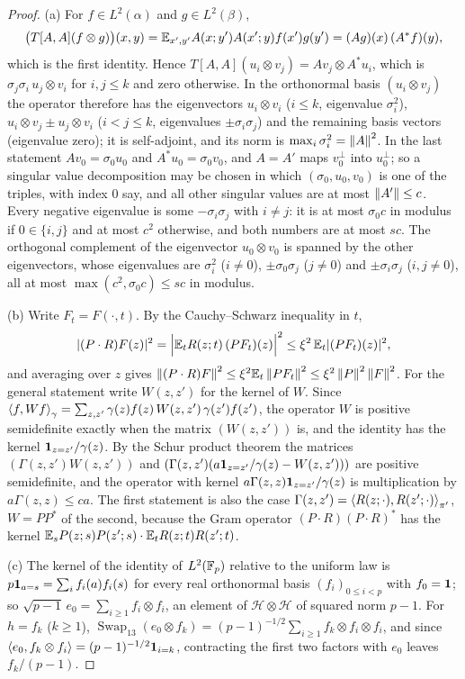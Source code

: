 \begin{proof}
(a) For $f\in L^2(\alpha)$ and $g\in L^2(\beta)$,
\[
  \big(T[A,A](f\otimes g)\big)(x,y)=\mathbb E_{x',y'}A(x;y')A(x';y)f(x')g(y')
  =(Ag)(x)\,(A^*f)(y),
\]
which is the first identity. Hence $T[A,A](u_i\otimes v_j)=Av_j\otimes A^*u_i$,
which is $\sigma_j\sigma_i\,u_j\otimes v_i$ for $i,j\le k$ and zero otherwise.
In the orthonormal basis $(u_i\otimes v_j)$ the operator therefore has the
eigenvectors $u_i\otimes v_i$ ($i\le k$, eigenvalue $\sigma_i^2$),
$u_i\otimes v_j\pm u_j\otimes v_i$ ($i<j\le k$, eigenvalues $\pm\sigma_i\sigma_j$)
and the remaining basis vectors (eigenvalue zero); it is self-adjoint, and its
norm is $\max_i\sigma_i^2=\left\|A\right\|^2$. In the last statement $Av_0=\sigma_0u_0$
and $A^*u_0=\sigma_0v_0$, and $A=A'$ maps $v_0^\perp$ into $u_0^\perp$; so a
singular value decomposition may be chosen in which $(\sigma_0,u_0,v_0)$ is one
of the triples, with index $0$ say, and all other singular values are at most
$\left\|A'\right\|\le c$. Every negative eigenvalue is some $-\sigma_i\sigma_j$ with
$i\ne j$: it is at most $\sigma_0c$ in modulus if $0\in\{i,j\}$ and at most $c^2$
otherwise, and both numbers are at most $sc$. The orthogonal complement of the
eigenvector $u_0\otimes v_0$ is spanned by the other eigenvectors, whose
eigenvalues are $\sigma_i^2$ ($i\ne0$), $\pm\sigma_0\sigma_j$ ($j\ne0$) and
$\pm\sigma_i\sigma_j$ ($i,j\ne0$), all at most $\max(c^2,\sigma_0c)\le sc$ in
modulus.

(b) Write $F_t=F(\cdot,t)$. By the Cauchy--Schwarz inequality in $t$,
\[
  |(P\cdot R)F(z)|^2=\Big|\mathbb E_tR(z;t)\,(PF_t)(z)\Big|^2\le\xi^2\,\mathbb E_t|(PF_t)(z)|^2,
\]
and averaging over $z$ gives
$\left\|(P\cdot R)F\right\|^2\le\xi^2\mathbb E_t\left\|PF_t\right\|^2\le\xi^2\left\|P\right\|^2\left\|F\right\|^2$. For
the general statement write $W(z,z')$ for the kernel of $W$. Since
$\left\langle f,Wf\right\rangle_\gamma=\sum_{z,z'}\gamma(z)f(z)\,W(z,z')\,\gamma(z')f(z')$, the
operator $W$ is positive semidefinite exactly when the matrix $(W(z,z'))$ is,
and the identity has the kernel $\mathbf 1_{z=z'}/\gamma(z)$. By the Schur product
theorem the matrices $(\Gamma(z,z')W(z,z'))$ and
$(\Gamma(z,z')(a\mathbf 1_{z=z'}/\gamma(z)-W(z,z')))$ are positive semidefinite, and
the operator with kernel $a\Gamma(z,z)\mathbf 1_{z=z'}/\gamma(z)$ is multiplication
by $a\Gamma(z,z)\le ca$. The first statement is also the case
$\Gamma(z,z')=\left\langle R(z;\cdot),R(z';\cdot)\right\rangle_{\pi'}$, $W=PP^*$ of the second,
because the Gram operator $(P\cdot R)(P\cdot R)^*$ has the kernel
$\mathbb E_sP(z;s)P(z';s)\cdot\mathbb E_tR(z;t)R(z';t)$.

(c) The kernel of the identity of $L^2(\mathbb F_p)$ relative to the uniform law is
$p\mathbf 1_{a=s}=\sum_if_i(a)f_i(s)$ for every real orthonormal basis $(f_i)_{0\le
i<p}$ with $f_0=\mathbf 1$; so $\sqrt{p-1}\,e_0=\sum_{i\ge1}f_i\otimes f_i$, an element
of $\mathcal H\otimes\mathcal H$ of squared norm $p-1$. For $h=f_k$ ($k\ge1$),
$\operatorname{Swap}_{13}(e_0\otimes f_k)=(p-1)^{-1/2}\sum_{i\ge1}f_k\otimes
f_i\otimes f_i$, and since $\left\langle e_0,f_k\otimes f_i\right\rangle=(p-1)^{-1/2}\mathbf 1_{i=k}$,
contracting the first two factors with $e_0$ leaves $f_k/(p-1)$.


\end{proof}
